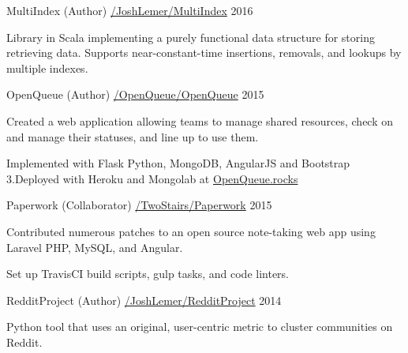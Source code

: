 \begin{cventries}
  \cventry
    {MultiIndex (Author) \quad\textbar\quad \href{https://github.com/joshlemer/multiindex}{\faGithubSquare /JoshLemer/MultiIndex}}
    {}
    {}
    {2016}
    {
      \begin{cvitems}
        \item {Library in Scala implementing a purely functional data structure for storing retrieving data. Supports near-constant-time insertions, removals, and lookups by multiple indexes.}
      \end{cvitems}
    }
  \cventry
    {OpenQueue (Author) \quad\textbar\quad \href{https://github.com/openqueue/openqueue} {\faGithubSquare /OpenQueue/OpenQueue}}
    {}
    {}
    {2015}
    {
      \begin{cvitems}
        \item {Created a web application allowing teams to manage shared resources, check on and manage their statuses, and line up to use them. }
        \item {Implemented with Flask Python, MongoDB, AngularJS and Bootstrap 3.Deployed with Heroku and Mongolab at \href{www.OpenQueue.rocks}{OpenQueue.rocks}}
      \end{cvitems}
    }
  \cventry
    {Paperwork (Collaborator) \quad\textbar\quad \href{https://github.com/twostairs/paperwork} {\faGithubSquare /TwoStairs/Paperwork}}
    {}
    {}
    {2015}
    {
      \begin{cvitems}
        \item {Contributed numerous patches to an open source note-taking web app using Laravel PHP, MySQL, and Angular.}
        \item {Set up TravisCI build scripts, gulp tasks, and code linters.}
      \end{cvitems}
    }
  \cventry
    {RedditProject (Author) \quad\textbar\quad \href{https://github.com/JoshLemer/RedditProject} {\faGithubSquare /JoshLemer/RedditProject}}
    {}
    {}
    {2014}
    {
      \begin{cvitems}
        \item {Python tool that uses an original, user-centric metric to cluster communities on Reddit.}
      \end{cvitems}
    }
\end{cventries}
